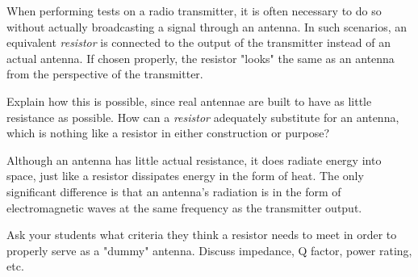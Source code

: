 

When performing tests on a radio transmitter, it is often necessary to do so without actually broadcasting a signal through an antenna.  In such scenarios, an equivalent {\it resistor} is connected to the output of the transmitter instead of an actual antenna.  If chosen properly, the resistor "looks" the same as an antenna from the perspective of the transmitter.

Explain how this is possible, since real antennae are built to have as little resistance as possible.  How can a {\it resistor} adequately substitute for an antenna, which is nothing like a resistor in either construction or purpose?







Although an antenna has little actual resistance, it does radiate energy into space, just like a resistor dissipates energy in the form of heat.  The only significant difference is that an antenna's radiation is in the form of electromagnetic waves at the same frequency as the transmitter output.







Ask your students what criteria they think a resistor needs to meet in order to properly serve as a "dummy" antenna.  Discuss impedance, Q factor, power rating, etc.




